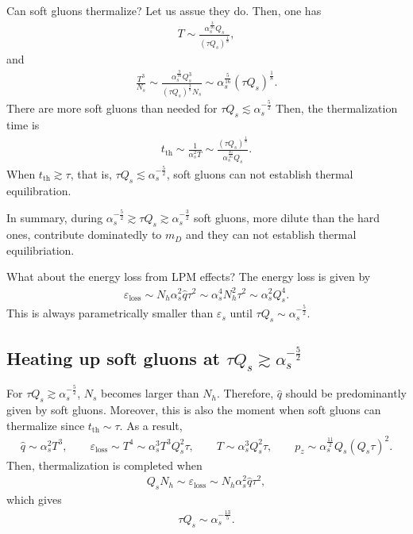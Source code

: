\documentclass[onecolumn,showpacs,nobibnotes,nofootinbib,12pt]{revtex4-1}
\begin{document}
Can soft gluons thermalize? Let us assue they do. Then, one has
\begin{align}
  T\sim \frac{\alpha_s^{\frac{3}{16}}Q_s}{(\tau Q_s)^{\frac{1}{8}}},
\end{align}
and
\begin{align}
  \frac{T^3}{N_s}\sim \frac{\alpha_s^{\frac{9}{16}}Q_s^3}{(\tau Q_s)^{\frac{3}{8}} N_s}\sim{\alpha_s^{\frac{5}{16}}}{(\tau Q_s)^{\frac{1}{8}}}.
\end{align}
There are more soft gluons than needed for $\tau Q_s\lesssim \alpha_s^{-\frac{5}{2}}$
Then, the thermalization time is
\begin{align}
  t_{\text{th}}\sim \frac{1}{\alpha_s^2 T}\sim  \frac{(\tau Q_s)^{\frac{1}{8}}}{\alpha_s^{\frac{35}{16}}Q_s}.
\end{align}
When $t_{\text{th}}\gtrsim \tau$, that is, $\tau Q_s \lesssim \alpha_s^{-\frac{5}{2}}$, soft gluons can not establish thermal equilibration.

In summary, during $\alpha_s^{-\frac{5}{2}}\gtrsim\tau Q_s\gtrsim \alpha_s^{-\frac{3}{2}}$ soft gluons, more dilute than the hard ones, contribute dominatedly to $m_D$ and they can not establish thermal equilibriation.

What about the energy loss from LPM effects? The energy loss is given by
\begin{align}
	\varepsilon_{\text{loss}}\sim N_h \alpha_s^2 \hat{q} \tau^2\sim \alpha_s^4 N_h^2 \tau^2\sim  \alpha_s^2 Q_s^4.
\end{align}
This is always parametrically smaller than $\varepsilon_s$ until $\tau Q_s \sim \alpha_s^{-\frac{5}{2}}$.

\subsection{Heating up soft gluons at $\tau Q_s\gtrsim\alpha_s^{-\frac{5}{2}}$}
For $\tau Q_s\gtrsim\alpha_s^{-\frac{5}{2}}$, $N_s$ becomes larger than $N_h$. Therefore, $\hat{q}$ should be predominantly given by soft gluons. Moreover, this is also the moment when soft gluons can thermalize since $t_{\text{th}}\sim \tau$. As a result, 
\begin{align}
\hat{q}\sim \alpha_s^2 T^3,\qquad \varepsilon_{\text{loss}}\sim T^4\sim  \alpha_s^3 T^3 Q_s^2 \tau,\qquad T\sim  \alpha_s^3 Q_s^2 \tau,\qquad p_z\sim \alpha_s^{\frac{11}{2}} Q_s (Q_s\tau)^2.
\end{align}
Then, thermalization is completed when
\begin{align}
Q_s N_h\sim\varepsilon_{\text{loss}}\sim N_h \alpha_s^2 \hat{q} \tau^2,
\end{align}
which gives
\begin{align}
\tau Q_s\sim \alpha_s^{-\frac{13}{5}}.
\end{align}
\end{document}
